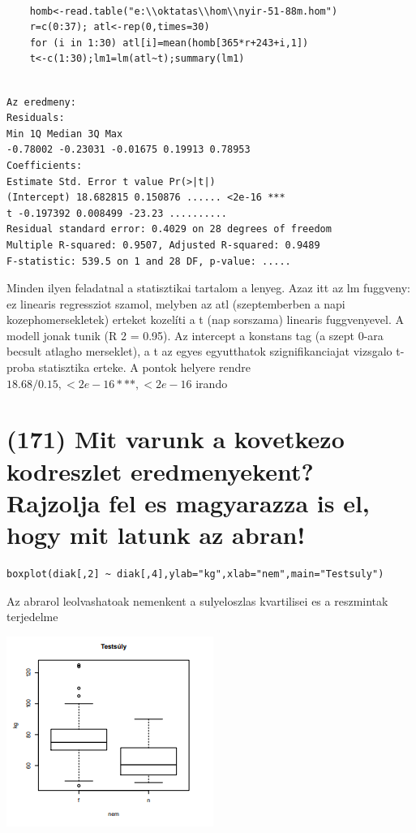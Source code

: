 \documentclass[12p]{article}
\begin{document}
\begin{verbatim}

	homb<-read.table("e:\\oktatas\\hom\\nyir-51-88m.hom")
	r=c(0:37); atl<-rep(0,times=30)
	for (i in 1:30) atl[i]=mean(homb[365*r+243+i,1])
	t<-c(1:30);lm1=lm(atl~t);summary(lm1)
	
\end{verbatim}
\begin{verbatim}
Az eredmeny:
Residuals:
Min 1Q Median 3Q Max
-0.78002 -0.23031 -0.01675 0.19913 0.78953
Coefficients:
Estimate Std. Error t value Pr(>|t|)
(Intercept) 18.682815 0.150876 ...... <2e-16 ***
t -0.197392 0.008499 -23.23 ..........
Residual standard error: 0.4029 on 28 degrees of freedom
Multiple R-squared: 0.9507, Adjusted R-squared: 0.9489
F-statistic: 539.5 on 1 and 28 DF, p-value: .....
\end{verbatim}

Minden ilyen feladatnal a statisztikai tartalom a lenyeg. Azaz itt az lm fuggveny: ez
linearis regressziot szamol, melyben az atl (szeptemberben a napi kozephomersekletek) erteket kozelíti a t (nap sorszama) linearis fuggvenyevel. A modell jonak tunik (R
2 = 0.95). Az
intercept a konstans tag (a szept 0-ara becsult atlagho merseklet), a t az egyes egyutthatok
szignifikanciajat vizsgalo t-proba statisztika erteke. A pontok helyere rendre $18.68/0.15, < 2e - 16 ***,
< 2e - 16$ irando


\section{(171) Mit varunk a kovetkezo kodreszlet eredmenyekent? Rajzolja fel es magyarazza is el, hogy
mit latunk az abran!}

\begin{verbatim}
boxplot(diak[,2] ~ diak[,4],ylab="kg",xlab="nem",main="Testsuly")
\end{verbatim}

Az abrarol leolvashatoak nemenkent a sulyeloszlas kvartilisei es a reszmintak terjedelme

\includegraphics{boxplot}
\end{document}
